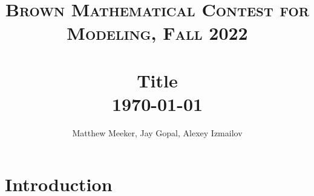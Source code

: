 \documentclass{article}
\title{	\normalsize \textsc{Brown Mathematical Contest for Modeling, Fall 2022} 	%
		 	\\[2.0cm]								%
			\HRule{0.5pt} \\						%
			\LARGE \textbf{Title}	%
			\HRule{2pt} \\ [0.5cm]		%
			\normalsize \today			%
		}
\author{
		Matthew Meeker, Jay Gopal, Alexey Izmailov\\
}
\makeatletter
\newcommand{\1}{\mathds{1}}	%
\def\printtitle{%
    {\centering \@title\par}}
\def\printauthor{%
    {\centering \large \@author}}
\makeatother
\begin{document}
\thispagestyle{empty}		%

\printtitle					%
  	\vfill
\printauthor				%
\newpage

\thispagestyle{empty}

\pagebreak
\setcounter{page}{1}		%

\section*{Introduction}
\label{sec:Introduction}


{}

\end{document}
